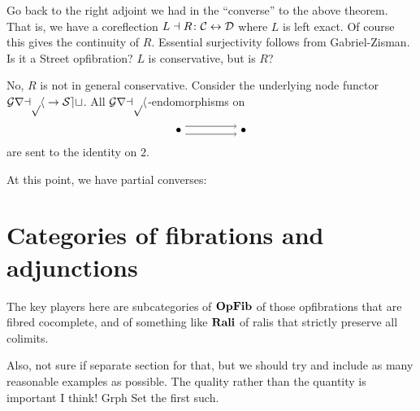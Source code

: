 \documentclass{amsart}
\begin{document}
Go back to the right adjoint we had in the ``converse'' to the above theorem.  That is, we have a coreflection $ L \dashv R \colon \mathcal{C} \leftrightarrow \mathcal{D} $ where $ L $ is left exact.  Of course this gives the continuity of $ R $. Essential surjectivity follows from Gabriel-Zisman. Is it a Street opfibration? $ L $ is conservative, but is $ R $?

\begin{ex}
	No, $ R $ is not in general conservative.  Consider the underlying node functor $ \mathcal{Graph} \to \mathcal{Set} $.  All $ \mathcal{Graph} $-endomorphisms on
	\[
	\begin{tikzpicture}
		\node (a) at (0,0) {$ \bullet $};
		\node (b) at (2,0) {$ \bullet $};
		\draw [->] (a.30) to (b.150);
		\draw [->] (a.-30) to (b.-150);
	\end{tikzpicture}
	\]
	are sent to the identity on $ 2 $.
\end{ex}

At this point, we have partial converses:

\hfill
{}

\section{Categories of fibrations and adjunctions}

The key players here are subcategories of $\mathbf{OpFib}$ of those opfibrations that are fibred cocomplete, and of something like
$\mathbf{Rali}$ of ralis that strictly preserve all colimits.

{\chris Also, not sure if separate section for that, but we should try and include as many reasonable examples as possible. The quality rather
than the quantity is important I think! Grph Set the first such.}



\end{document}
